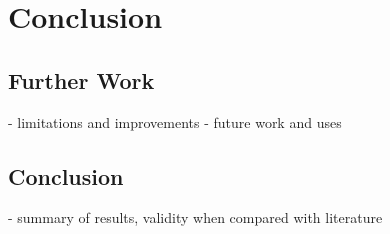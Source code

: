 \chapter{Conclusion}\label{ch:Consclusion}

\section{Further Work}
- limitations and improvements
- future work and uses

\section{Conclusion}
- summary of results, validity when compared with literature
